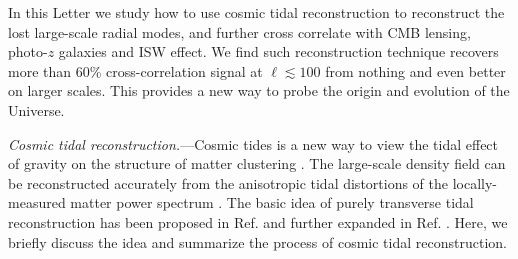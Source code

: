 \documentclass[aps,prl,twocolumn,showpacs,superscriptaddress,groupedaddress,nofootinbib,floatfix]{revtex4}  %
\begin{document}

In this Letter we study how to use cosmic tidal reconstruction to 
reconstruct the lost large-scale radial modes, and further cross correlate with
CMB lensing, photo-$z$ galaxies and ISW effect. 
We find such reconstruction technique recovers more than 60\% cross-correlation 
signal at $\ell\lesssim100$ from nothing and even better on larger scales. 
This provides a new way to probe the origin and evolution of the Universe.

{\it Cosmic tidal reconstruction.}---Cosmic tides is a new way to view the
tidal effect of gravity on the structure of matter clustering \cite{2012:pen}.
The large-scale density field can be reconstructed accurately from the 
anisotropic tidal distortions of the locally-measured matter power spectrum
\cite{2012:pen,2015:zhu}.
The basic idea of purely transverse tidal reconstruction has been proposed in
Ref. \cite{2012:pen} and further expanded in Ref. \cite{2015:zhu}.
Here, we briefly discuss the idea and summarize the process of cosmic
tidal reconstruction. 
\end{document}
